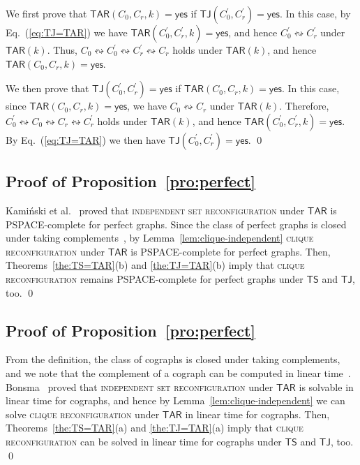 \documentclass{llncs}
\newcommand{\sevstep}{\leftrightsquigarrow}
\newcommand{\TAR}[1]{\mathsf{TAR}(#1)}
\newcommand{\TS}{\mathsf{TS}}
\newcommand{\TJ}{\mathsf{TJ}}
\newcommand{\ini}{0}
\newcommand{\tar}{r}
\newcommand{\cliq}{C}
\newcommand{\TARrule}{\mathsf{TAR}}
\newcommand{\YES}{\mathsf{yes}}
\newcommand{\TARins}[3]{\mathsf{TAR}(#1,#2,#3)}
\newcommand{\TJins}[2]{\mathsf{TJ}(#1,#2)}
\begin{document}
	We first prove that $\TARins{\cliq_{\ini}}{\cliq_{\tar}}{k} = \YES$ if $\TJins{\cliq_{\ini}^\prime}{\cliq_{\tar}^\prime} = \YES$.
	In this case, by Eq.~(\ref{eq:TJ=TAR}) we have $\TARins{\cliq_{\ini}^\prime}{\cliq_{\tar}^\prime}{k} = \YES$, and hence $\cliq_{\ini}^\prime \sevstep \cliq_{\tar}^\prime$ under $\TAR{k}$.
	Thus, $\cliq_{\ini} \sevstep \cliq_{\ini}^\prime \sevstep \cliq_{\tar}^\prime \sevstep \cliq_{\tar}$ holds under $\TAR{k}$, and hence $\TARins{\cliq_{\ini}}{\cliq_{\tar}}{k} = \YES$. 
	
	We then prove that $\TJins{\cliq_{\ini}^\prime}{\cliq_{\tar}^\prime} = \YES$ if $\TARins{\cliq_{\ini}}{\cliq_{\tar}}{k} = \YES$.
	In this case, since $\TARins{\cliq_{\ini}}{\cliq_{\tar}}{k} = \YES$, we have $\cliq_{\ini} \sevstep \cliq_{\tar}$ under $\TAR{k}$.
	Therefore, $\cliq_{\ini}^\prime \sevstep \cliq_{\ini} \sevstep \cliq_{\tar} \sevstep \cliq_{\tar}^\prime$ holds under $\TAR{k}$, and hence $\TARins{\cliq_{\ini}^\prime}{\cliq_{\tar}^\prime}{k} = \YES$. 
	By Eq.~(\ref{eq:TJ=TAR}) we then have $\TJins{\cliq_{\ini}^\prime}{\cliq_{\tar}^\prime} = \YES$.
\qed




	\subsection{Proof of Proposition~\ref{pro:perfect}}
Kami\'nski et al.~\cite[Theorem~3]{KaminskiMM12} proved that \textsc{independent set reconfiguration} under $\TARrule$ is PSPACE-complete for perfect graphs.
	Since the class of perfect graphs is closed under taking complements~\cite{Lovasz72}, by Lemma~\ref{lem:clique-independent} \textsc{clique reconfiguration} under $\TARrule$ is PSPACE-complete for perfect graphs.
	Then, Theorems~\ref{the:TS=TAR}(b) and \ref{the:TJ=TAR}(b) imply that \textsc{clique reconfiguration} remains PSPACE-complete for perfect graphs under $\TS$ and $\TJ$, too.
	\qed




	\subsection{Proof of Proposition~\ref{pro:perfect}}
From the definition, the class of cographs is closed under taking complements, and we note that the complement of a cograph can be computed in linear time~\cite{CorneilPS85}.
	Bonsma~\cite{Bon14} proved that \textsc{independent set reconfiguration} under $\TARrule$ is solvable in linear time for cographs, and hence by Lemma~\ref{lem:clique-independent} we can solve \textsc{clique reconfiguration} under $\TARrule$ in linear time for cographs. 
	Then, Theorems~\ref{the:TS=TAR}(a) and \ref{the:TJ=TAR}(a) imply that \textsc{clique reconfiguration} can be solved in linear time for cographs under $\TS$ and $\TJ$, too.
	\qed
\end{document}
